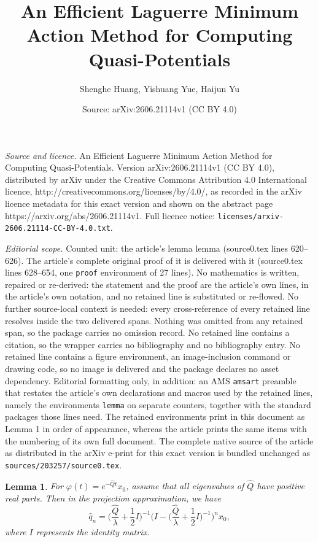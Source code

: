 \documentclass[10pt,a4paper]{amsart}
\title{An Efficient Laguerre Minimum Action Method for Computing Quasi-Potentials}
\author{Shenghe Huang, Yishuang Yue, Haijun Yu}
\date{Source: arXiv:2606.21114v1 (CC BY 4.0)}
\newtheorem{lemma}{Lemma}
\begin{document}
\maketitle

\noindent\emph{Source and licence.} An Efficient Laguerre Minimum Action Method for Computing Quasi-Potentials. Version arXiv:2606.21114v1 (CC BY 4.0), distributed by arXiv under the Creative Commons Attribution 4.0 International licence, http://creativecommons.org/licenses/by/4.0/, as recorded in the arXiv licence metadata for this exact version and shown on the abstract page https://arxiv.org/abs/2606.21114v1. Full licence notice: \texttt{licenses/arxiv-2606.21114-CC-BY-4.0.txt}.\par\smallskip

\noindent\textit{Editorial scope.} Counted unit: the article's lemma lemma (source0.tex lines 620--626). The article's complete original proof of it is delivered with it (source0.tex lines 628--654, one \texttt{proof} environment of 27 lines). No mathematics is written, repaired or re-derived: the statement and the proof are the article's own lines, in the article's own notation, and no retained line is substituted or re-flowed.  No further source-local context is needed: every cross-reference of every retained line resolves inside the two delivered spans.  Nothing was omitted from any retained span, so the package carries no omission record.  No retained line contains a citation, so the wrapper carries no bibliography and no bibliography entry.  No retained line contains a figure environment, an image-inclusion command or drawing code, so no image is delivered and the package declares no asset dependency.  Editorial formatting only, in addition: an AMS \texttt{amsart} preamble that restates the article's own declarations and macros used by the retained lines, namely the environments \texttt{lemma} on separate counters, together with the standard packages those lines need.  The retained environments print in this document as Lemma 1 in order of appearance, whereas the article prints the same items with the numbering of its own full document.  The complete native source of the article as distributed in the arXiv e-print for this exact version is bundled unchanged as \texttt{sources/203257/source0.tex}.
\begin{lemma}
	For $\varphi(t)=e^{-\widehat{Q}t}x_0$, assume that all eigenvalues of $\widehat{Q}$ have positive real parts. Then in the projection approximation, we have
	\[  \widehat{q }_n = \bigl( \frac{\hat{Q}}{\lambda} + \frac{1}{2} I
	\bigr)^{- 1} \bigl( I - \bigl( \frac{\hat{Q}}{\lambda} + \frac{1}{2} I
	\bigr)^{- 1} \bigr)^n x_0, \]
	where $I$ represents the identity matrix.
\end{lemma}
\end{document}
